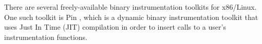 There are several freely-available binary instrumentation toolkits for x86/Linux. One such toolkit
is Pin \cite{luk2005pin}, which is a dynamic binary instrumentation toolkit that uses Just In Time (JIT)
compilation in order to insert calls to a user's instrumentation functions.